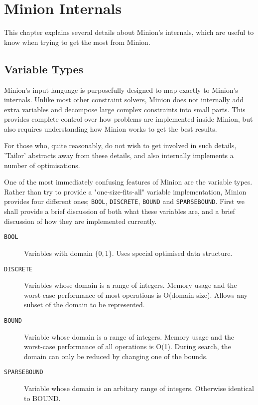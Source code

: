 \documentclass{article}
\newcommand{\BOOL}{\texttt{BOOL}\xspace}
\newcommand{\DISCRETE}{\texttt{DISCRETE}\xspace}
\newcommand{\BOUND}{\texttt{BOUND}\xspace}
\newcommand{\SPARSEBOUND}{\texttt{SPARSEBOUND}\xspace}
\begin{document}
\section{Minion Internals}

This chapter explains several details about Minion's internals, which are useful to know when trying to get the most from Minion.

\subsection{Variable Types}

Minion's input language is purposefully designed to map exactly to Minion's internals. Unlike most other constraint solvers, Minion does not internally add extra variables and decompose large complex constraints into small parts. This provides complete control over how problems are implemented inside Minion, but also requires understanding how Minion works to get the best results.

For those who, quite reasonably, do not wish to get involved in such details, 'Tailor' abstracts away from these details, and also internally implements a number of optimisations.

One of the most immediately confusing features of Minion are the variable types. Rather than try to provide a "one-size-fits-all" variable implementation, Minion provides four different ones; \BOOL, \DISCRETE, \BOUND and \SPARSEBOUND.  First we shall provide a brief discussion of both what these variables are, and a brief discussion of how they are implemented currently.

\begin{description}
\item[\BOOL] Variables with domain \(\{0,1\}\). Uses special optimised data structure.
\item[\DISCRETE] Variables whose domain is a range of integers. Memory usage and the worst-case performance of most operations is O(domain size). Allows any subset of the domain to be represented.
\item[\BOUND] Variable whose domain is a range of integers. Memory usage and the worst-case performance of all operations is O(1). During search, the domain can only be reduced by changing one of the bounds.
\item[\SPARSEBOUND] Variable whose domain is an arbitary range of integers. Otherwise identical to BOUND.
\end{description}
\end{document}
